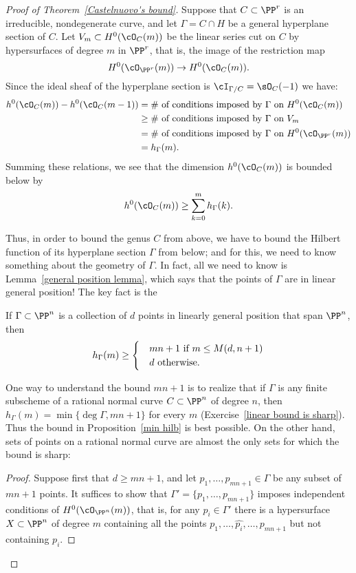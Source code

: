 \begin{proof}[Proof of Theorem~\ref{Castelnuovo's bound}]
Suppose that $C \subset \PP^r$ is an irreducible, nondegenerate curve, and let $\Gamma = C \cap H$ be a general hyperplane section of $C$. Let $V_m \subset H^0(\cO_C(m))$ be the linear series cut on $C$ by hypersurfaces of degree $m$ in $\PP^r$, that is, the image of the restriction map
$$
H^0(\cO_{\PP^r}(m)) \to H^0(\cO_C(m)).
$$
Since the ideal sheaf of the hyperplane section is $\cI_{\Gamma/C} = \sO_C(-1)$ we have:
\begin{align*}
h^0(\cO_C(m)) - h^0(\cO_C(m-1)) & = \text{\# of conditions imposed by $\Gamma$ on $H^0(\cO_C(m))$} \\
&\geq \text{\# of conditions imposed by $\Gamma$ on $V_m$} \\
&= \text{\# of conditions imposed by $\Gamma$ on $H^0(\cO_{\PP^r}(m))$} \\
&= h_\Gamma(m).
\end{align*}
Summing these relations, we see that the dimension $h^0(\cO_C(m))$ is bounded below by
$$
h^0(\cO_C(m)) \geq \sum_{k=0}^m h_\Gamma(k).
$$

Thus, in order to bound the genus $C$ from above, we have to bound the Hilbert function of its hyperplane section $\Gamma$  from below; and for this, we need to know something about the geometry of $\Gamma$. In fact, all we need to know is Lemma~\ref{general position lemma}, which says that the points of $\Gamma$ are in linear general position! The key fact is the

\begin{proposition}\label{min hilb}
If $\Gamma \subset \PP^n$ is a collection of $d$ points in linearly general position that span $\PP^n$, then 
$$
h_\Gamma(m) \geq 
\begin{cases}
&mn+1\hbox{ if $m\leq M(d,n+1)$}\\
&d \hbox{ otherwise.}
\end{cases}
$$
\end{proposition}

One way to understand the bound $mn+1$ is to realize that if $\Gamma$ is any finite subscheme of a rational normal curve $C\subset\PP^n$ of degree $n$, 
then $h_\Gamma(m) = \min\{\deg \Gamma, mn+1\}$ for every $m$ (Exercise~\ref{linear bound is sharp}).
  Thus the bound in Proposition~\ref{min hilb} is best possible.
On the other hand, sets of points on a rational normal curve are almost the only sets for which the bound is sharp:


\begin{proof}
Suppose first that $d \geq mn+1$, and let $p_1,\dots,p_{mn+1} \in \Gamma$ be any subset of $mn+1$ points. It suffices to show that $\Gamma' = \{p_1,\dots,p_{mn+1}\}$ imposes independent conditions of $H^0(\cO_{\PP^n}(m))$, that is, for any $p_i \in \Gamma'$ there is a hypersurface $X \subset \PP^n$ of degree $m$ containing all the points $p_1,\dots, \hat{p_i},\dots,p_{mn+1}$ but not containing $p_i$.


\end{proof}
\end{proof}
